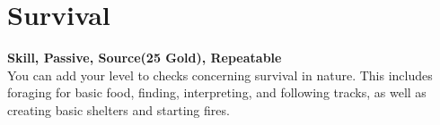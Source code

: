 \section{Survival}\label{sec:survival}
\textbf{Skill, Passive, Source(25 Gold), Repeatable}\\
You can add your level to checks concerning survival in nature.
This includes foraging for basic food, finding, interpreting, and following tracks, as well as creating basic shelters and starting fires.